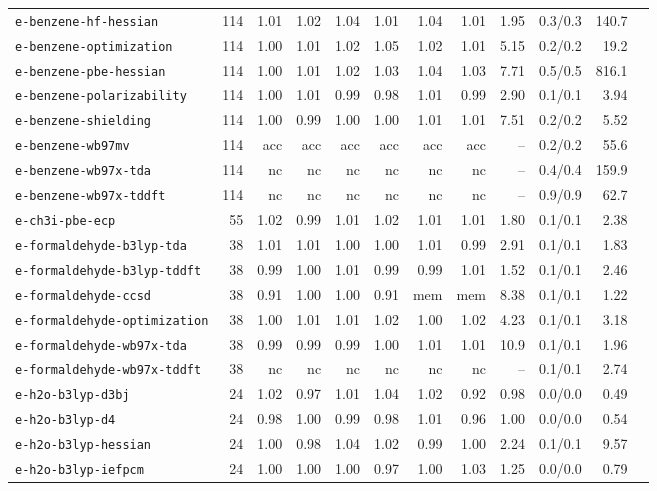 \begin{longtable}{lrrrrrrrrrrr}
\texttt{e-benzene-hf-hessian} & 114 & 1.01 & 1.02 & 1.04 & 1.01 & 1.04 & 1.01 & 1.95 & 0.3/0.3 & 140.7 \\
\texttt{e-benzene-optimization} & 114 & 1.00 & 1.01 & 1.02 & 1.05 & 1.02 & 1.01 & 5.15 & 0.2/0.2 & 19.2 \\
\texttt{e-benzene-pbe-hessian} & 114 & 1.00 & 1.01 & 1.02 & 1.03 & 1.04 & 1.03 & 7.71 & 0.5/0.5 & 816.1 \\
\texttt{e-benzene-polarizability} & 114 & 1.00 & 1.01 & 0.99 & 0.98 & 1.01 & 0.99 & 2.90 & 0.1/0.1 & 3.94 \\
\texttt{e-benzene-shielding} & 114 & 1.00 & 0.99 & 1.00 & 1.00 & 1.01 & 1.01 & 7.51 & 0.2/0.2 & 5.52 \\
\texttt{e-benzene-wb97mv} & 114 & acc & acc & acc & acc & acc & acc & -- & 0.2/0.2 & 55.6 \\
\texttt{e-benzene-wb97x-tda} & 114 & nc & nc & nc & nc & nc & nc & -- & 0.4/0.4 & 159.9 \\
\texttt{e-benzene-wb97x-tddft} & 114 & nc & nc & nc & nc & nc & nc & -- & 0.9/0.9 & 62.7 \\
\texttt{e-ch3i-pbe-ecp} & 55 & 1.02 & 0.99 & 1.01 & 1.02 & 1.01 & 1.01 & 1.80 & 0.1/0.1 & 2.38 \\
\texttt{e-formaldehyde-b3lyp-tda} & 38 & 1.01 & 1.01 & 1.00 & 1.00 & 1.01 & 0.99 & 2.91 & 0.1/0.1 & 1.83 \\
\texttt{e-formaldehyde-b3lyp-tddft} & 38 & 0.99 & 1.00 & 1.01 & 0.99 & 0.99 & 1.01 & 1.52 & 0.1/0.1 & 2.46 \\
\texttt{e-formaldehyde-ccsd} & 38 & 0.91 & 1.00 & 1.00 & 0.91 & mem & mem & 8.38 & 0.1/0.1 & 1.22 \\
\texttt{e-formaldehyde-optimization} & 38 & 1.00 & 1.01 & 1.01 & 1.02 & 1.00 & 1.02 & 4.23 & 0.1/0.1 & 3.18 \\
\texttt{e-formaldehyde-wb97x-tda} & 38 & 0.99 & 0.99 & 0.99 & 1.00 & 1.01 & 1.01 & 10.9 & 0.1/0.1 & 1.96 \\
\texttt{e-formaldehyde-wb97x-tddft} & 38 & nc & nc & nc & nc & nc & nc & -- & 0.1/0.1 & 2.74 \\
\texttt{e-h2o-b3lyp-d3bj} & 24 & 1.02 & 0.97 & 1.01 & 1.04 & 1.02 & 0.92 & 0.98 & 0.0/0.0 & 0.49 \\
\texttt{e-h2o-b3lyp-d4} & 24 & 0.98 & 1.00 & 0.99 & 0.98 & 1.01 & 0.96 & 1.00 & 0.0/0.0 & 0.54 \\
\texttt{e-h2o-b3lyp-hessian} & 24 & 1.00 & 0.98 & 1.04 & 1.02 & 0.99 & 1.00 & 2.24 & 0.1/0.1 & 9.57 \\
\texttt{e-h2o-b3lyp-iefpcm} & 24 & 1.00 & 1.00 & 1.00 & 0.97 & 1.00 & 1.03 & 1.25 & 0.0/0.0 & 0.79 \\

\end{longtable}
